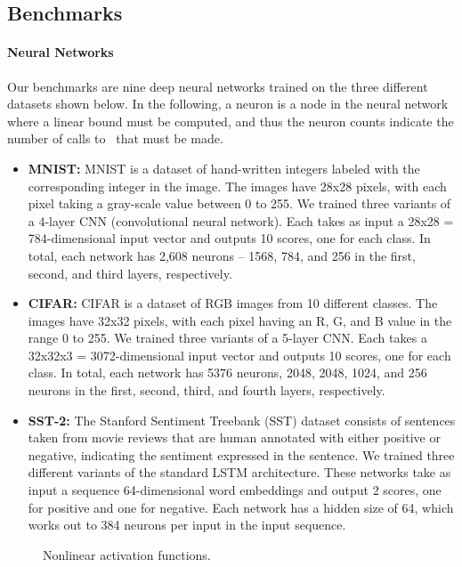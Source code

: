 \subsection{Benchmarks}

\paragraph{Neural Networks}
Our benchmarks are nine deep neural networks trained on the three
different datasets shown below. In the following, a neuron is a node in the
neural network where a linear bound must be computed, and thus the neuron counts
indicate the number of calls to~\Name{} that must be made.
\begin{itemize}
\item
\textbf{MNIST:}
MNIST is a dataset of hand-written integers labeled with the
corresponding integer in the image. The images have 28x28 pixels, with
each pixel taking a gray-scale value between 0 to 255. We trained
three variants of a 4-layer CNN (convolutional neural network). Each takes as
input a 28x28 = 784-dimensional input vector and outputs 10 scores, one for
each
class. In total, each network has 2,608 neurons -- 1568, 784, and 256 in
the first, second, and third layers, respectively.

\item
\textbf{CIFAR:}
CIFAR is a dataset of RGB images from 10 different classes. The images
have 32x32 pixels, with each pixel having an R, G, and B value in the
range 0 to 255. We trained three variants of a 5-layer CNN. Each takes a
32x32x3 = 3072-dimensional input vector and outputs 10 scores, one for each
class. In total, each network has 5376 neurons, 2048, 2048, 1024, and 256
neurons in the first, second, third, and fourth layers, respectively.

\item
\textbf{SST-2:}
The Stanford Sentiment Treebank (SST) dataset consists of sentences
taken from movie reviews that are human annotated with either positive
or negative, indicating the sentiment expressed in the sentence. We
trained three different variants of the standard LSTM architecture. These
networks take as input a sequence 64-dimensional word embeddings and
output 2 scores, one for positive and one for negative. Each network has a
hidden size of 64, which works out to 384 neurons per input in the input
sequence.
\end{itemize}

\begin{figure}[h]
	\centering
	\scalebox{0.5}{
	}
	\caption{Nonlinear activation functions.\label{onlinesyn:fig:actfuncs}}
\end{figure}

